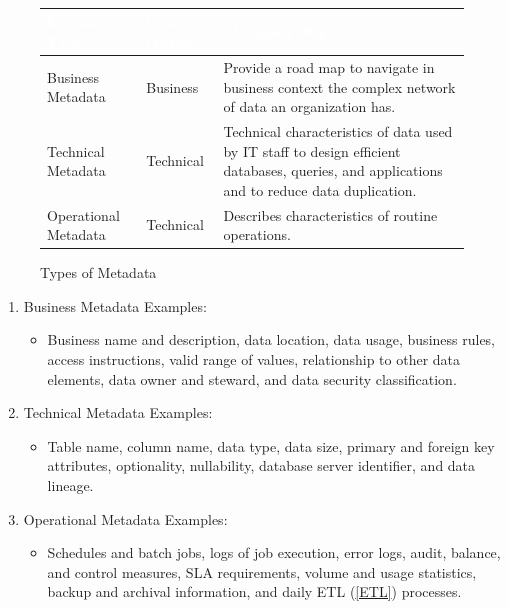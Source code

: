 \begin{figure}[H]
\begin{center}
    \renewcommand{\arraystretch}{1.5}
    \begin{tabular}{|>{\raggedright\arraybackslash}m{3.5cm}
                    |>{\raggedright\arraybackslash}m{3cm}
                    |>{\raggedright\arraybackslash}m{8cm}
                    |}
    \hline
    \rowcolor[HTML]{196fb4}\centering\textcolor{white}{\large Metadata Type} 
                            & \centering\textcolor{white}{\large Data Owner} 
                            & \centering\textcolor{white}{\large Metadata Objective} 
                            \tabularnewline 
    \hline
    Business Metadata & Business & Provide a road map to navigate in business context the complex network of data an organization has. \\\hline
    Technical Metadata & Technical & Technical characteristics of data used by IT staff to design efficient databases, queries, and applications and to reduce data duplication.\\\hline
    Operational Metadata & Technical & Describes characteristics of routine operations.\\\hline
    \end{tabular}
\end{center}
\caption{Types of Metadata}
\label{Types of Metadata}
\end{figure}

\begin{enumerate}
    \item Business Metadata Examples:
    \begin{itemize}
        \item Business name and description, data location, data usage, business rules, access instructions, valid range of values, relationship to other data elements, data owner and steward, and data security classification.
    \end{itemize}
    \item Technical Metadata Examples: 
    \begin{itemize}
        \item Table name, column name, data type, data size, primary and foreign key attributes, optionality, nullability, database server identifier, and data lineage.
    \end{itemize}
    \item Operational Metadata Examples:
    \begin{itemize}
        \item Schedules and batch jobs, logs of job execution, error logs, audit, balance, and control measures, SLA requirements, volume and usage statistics, backup and archival information, and daily ETL (\ref{ETL}) processes.
    \end{itemize}
\end{enumerate}

